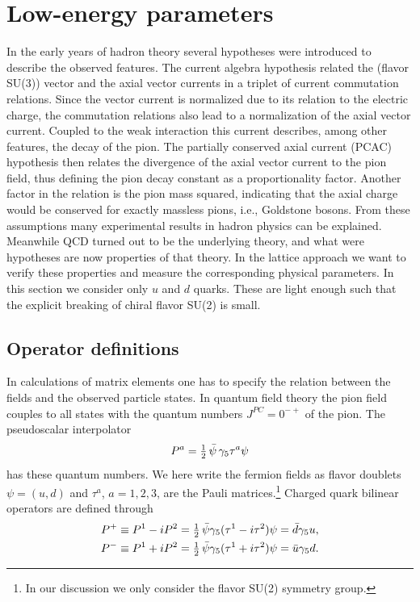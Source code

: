 \section{Low-energy parameters}
In the early years of hadron theory several hypotheses were introduced to describe the observed features. The current algebra hypothesis related the (flavor
SU(3)) vector and the axial vector currents in a triplet of current commutation relations. Since the vector current is normalized due to its relation to the
electric charge, the commutation relations also lead to a normalization of the
axial vector current. Coupled to the weak interaction this current describes,
among other features, the decay of the pion. The partially conserved axial current (PCAC) hypothesis then relates the divergence of the axial vector current
to the pion field, thus defining the pion decay constant as a proportionality
factor. Another factor in the relation is the pion mass squared, indicating that
the axial charge would be conserved for exactly massless pions, i.e., Goldstone
bosons. From these assumptions many experimental results in hadron physics
can be explained. Meanwhile QCD turned out to be the underlying theory,
and what were hypotheses are now properties of that theory. In the lattice
approach we want to verify these properties and measure the corresponding
physical parameters.
In this section we consider only $u$ and $d$ quarks. These are light enough
such that the explicit breaking of chiral flavor SU(2) is small.

\subsection{Operator definitions}
In calculations of matrix elements one has to specify the relation between the
fields and the observed particle states. In quantum field theory the pion field
couples to all states with the quantum numbers $J^{PC} = 0^{-+}$ of the pion. The
pseudoscalar interpolator
\begin{equation}
P^a = \tfrac{1}{2}\,\bar{\psi}\,\gamma_5\tau^a\psi
\end{equation}
has these quantum numbers. We here write the fermion fields as flavor doublets
$\psi = (u, d)$ and $\tau^a$, $a = 1, 2, 3$, are the Pauli matrices.\footnote{In our
discussion we only consider the flavor SU(2) symmetry group.} Charged quark bilinear
operators are defined through
\begin{equation}
\begin{aligned}
P^+ &\equiv P^1 - i P^2 = \tfrac{1}{2}\,\bar{\psi}\gamma_5(\tau^1 - i\tau^2)\psi = \bar{d}\gamma_5 u , \\
P^- &\equiv P^1 + i P^2 = \tfrac{1}{2}\,\bar{\psi}\gamma_5(\tau^1 + i\tau^2)\psi = \bar{u}\gamma_5 d .
\end{aligned}
\end{equation}

